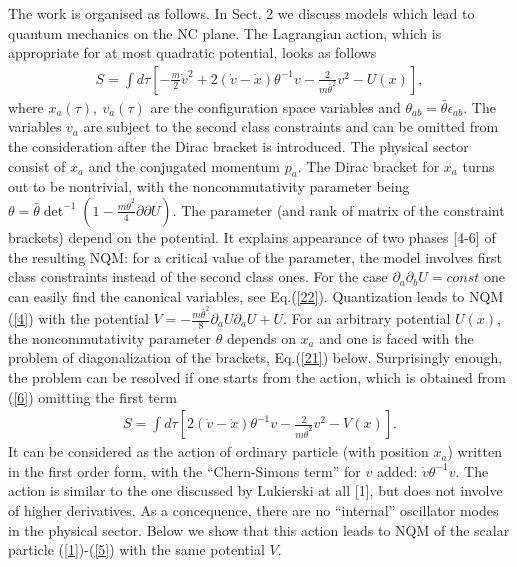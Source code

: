\documentclass[paper a4]{article}
\begin{document}
The work is organised as follows. In Sect. 2 we discuss models which
lead to quantum mechanics
on the NC plane. The Lagrangian action, which is
appropriate for at most quadratic potential, looks as follows
\begin{eqnarray}\label{6}
S=\int d\tau\left[-\frac{m}{2}\dot v^2+2(\dot v-\dot x)\theta^{-1}v
-\frac{2}{m\bar\theta^2}v^2-U(x)\right],
\end{eqnarray}
where $x_a(\tau), ~ v_a(\tau)$ are the configuration space variables and
$\theta_{ab}=\bar\theta\epsilon_{ab}$. The variables $v_a$ are subject
to the second class constraints  and can be omitted from
the consideration after the Dirac bracket is
introduced. The physical sector consist of $x_a$ and the conjugated
momentum $p_a$. The Dirac bracket for $x_a$ turns out to be nontrivial,
with the noncommutativity parameter being
$\theta=\bar\theta{\det}^{-1}(1-\frac{m\bar\theta^2}{4}\partial\partial U)$.
The parameter (and rank of matrix of the constraint
brackets) depend on the potential.
It explains appearance of two phases [4-6] of the resulting NQM:
for a critical
value of the parameter, the model involves first class constraints instead
of the second class ones.
For the case $\partial_a\partial_b U=const$ one can easily find the
canonical variables, see Eq.(\ref{22}).
Quantization leads to NQM (\ref{4}) with the potential
$V=-\frac{m\bar\theta^2}{8}\partial_aU\partial_aU+U$. For an arbitrary
potential $U(x)$, the noncommutativity parameter $\theta$ depends on
$x_a$ and one is faced with the problem of diagonalization of the
brackets, Eq.(\ref{21}) below. Surprisingly enough, the
problem can be resolved
if one starts from the action, which is obtained from (\ref{6})
omitting the first term
\begin{eqnarray}\label{9}
S=\int d\tau\left[2(\dot v-\dot x)\theta^{-1}v-\frac{2}{m\bar\theta^2}v^2-
V(x)\right].
\end{eqnarray}
It can be considered as the action of ordinary particle (with position
$x_a$) written in the first order form, with the
``Chern-Simons term'' for $v$ added: $\dot v\theta^{-1}v$.
The action is similar to the one discussed by Lukierski at all [1], but
does not involve of higher derivatives. As a concequence, there are no
``internal'' oscillator modes in the physical sector. Below
we show that this action leads to NQM of the scalar particle
(\ref{1})-(\ref{5}) with the same potential $V$.
\end{document}
